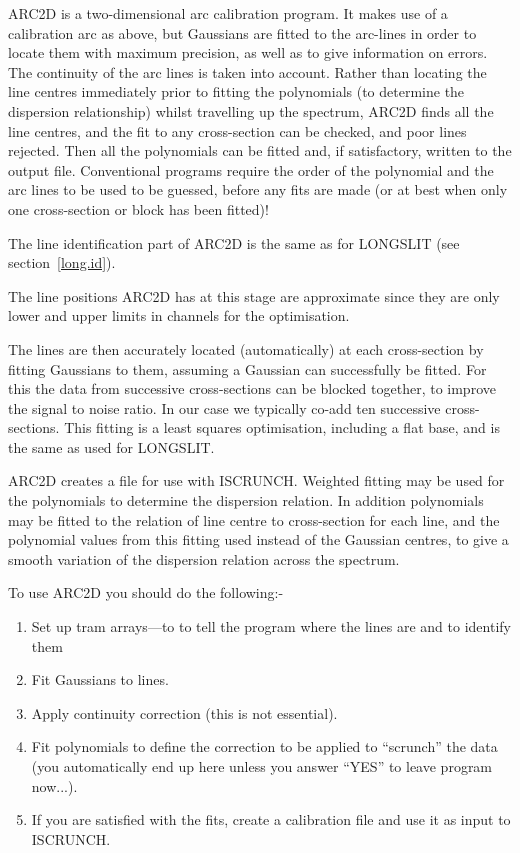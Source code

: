 \documentclass[11pt,twoside]{article}
\begin{document}
ARC2D is a two-dimensional arc calibration program. It makes use of a
calibration arc as above, but Gaussians are fitted to the arc-lines in
order to locate them with maximum precision, as well as to give
information on errors. The continuity of the arc lines is taken into
account. Rather than locating the line centres immediately prior to
fitting the polynomials (to determine the dispersion relationship)
whilst travelling up the spectrum, ARC2D finds all the line centres,
and the fit to any cross-section can be checked, and poor lines
rejected. Then all the polynomials can be fitted and, if satisfactory,
written to the output file. Conventional programs require the order of
the polynomial and the arc lines to be used to be guessed, before any
fits are made (or at best when only one cross-section or block has been
fitted)!

The line identification part of ARC2D is the same as for LONGSLIT (see
section~\ref{long.id}).

The line positions ARC2D has at this stage are approximate since they
are only lower and upper limits in channels for the optimisation.

The lines are then accurately located (automatically) at each
cross-section by fitting Gaussians to them, assuming a Gaussian can
successfully be fitted. For this the data from successive
cross-sections can be blocked together, to improve the signal to noise
ratio. In our case we typically co-add ten successive cross-sections.
This fitting is a least squares optimisation, including a flat base,
and is the same as used for LONGSLIT.

ARC2D creates a file for use with ISCRUNCH.
Weighted fitting may be used for the
polynomials to determine the dispersion relation. In addition
polynomials may be fitted to the relation of line centre to
cross-section for each line, and the polynomial values from this
fitting used instead of the Gaussian centres, to give a smooth
variation of the dispersion relation across the spectrum.

  To use ARC2D you should do the following:-

\begin{enumerate}
\item Set up tram arrays---to to tell the program where the lines are
and to identify them
\item Fit Gaussians to lines.
\item Apply continuity correction (this is not essential).
\item Fit polynomials to define the correction to be applied to
``scrunch'' the data (you automatically end up here unless you answer
``YES'' to leave program now...).
\item If you are satisfied with the fits, create a calibration file and
use it as input to ISCRUNCH.
\end{enumerate}
\end{document}

